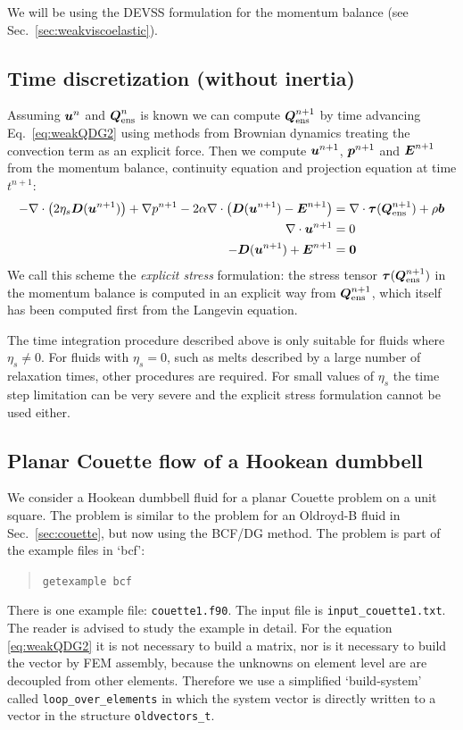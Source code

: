 We will be using the DEVSS formulation for the momentum balance
(see Sec.~\ref{sec:weakviscoelastic}).

\subsection{Time discretization (without inertia)}

Assuming $\boldsymbol{u}^{n}$ and $\boldsymbol{Q}^n_\text{ens}$ is known we can compute
$\boldsymbol{Q}^{n+1}_\text{ens}$ by
time advancing Eq.~\eqref{eq:weakQDG2} using methods from Brownian dynamics
treating the convection term as an explicit force.
Then we compute $\boldsymbol{u}^{n+1}$, 
$\boldsymbol{p}^{n+1}$ and $\boldsymbol{E}^{n+1}$ from the momentum balance,
continuity equation and projection equation at time $t^{n+1}$:
\begin{align}
      -\nabla\cdot\big(2\eta_s\boldsymbol{D}(\boldsymbol{u}^{n+1})\big) +\nabla p^{n+1} 
  -2\alpha\nabla\cdot\big( \boldsymbol{D}(\boldsymbol{u}^{n+1}) -\boldsymbol{E}^{n+1} \big)
&=\nabla\cdot\boldsymbol{\tau}(\boldsymbol{Q}^{n+1}_\text{ens})
        + \rho\boldsymbol{b} \label{eq:mombalQDG}\\
     \nabla\cdot\boldsymbol{u}^{n+1}&=0\\
   -\boldsymbol{D}(\boldsymbol{u}^{n+1})+\boldsymbol{E}^{n+1} &= \boldsymbol{0}
\end{align}
We call this scheme the \emph{explicit stress} formulation: the stress tensor
$\boldsymbol{\tau}(\boldsymbol{Q}^{n+1}_\text{ens})$ in the momentum balance is
computed in an
explicit way from $\boldsymbol{Q}^{n+1}_\text{ens}$, which itself has been
computed first from the Langevin equation.

The time integration procedure described above is only suitable for fluids
where $\eta_s\neq0$. For fluids with $\eta_s=0$, such as melts described by a
large number of relaxation times, other procedures are required.
For small values of
$\eta_s$ the time step limitation can be very severe and the explicit stress
formulation cannot be used either. 

\subsection{Planar Couette flow of a Hookean dumbbell}
\label{sec:bcfcouette}

We consider a Hookean dumbbell fluid for a planar Couette problem on a
unit square.
The problem is similar to the problem for an Oldroyd-B fluid in
Sec.~\ref{sec:couette}, but now using the BCF/DG method.
The problem is part of the example files in `bcf':
\begin{quote}
   \texttt{getexample bcf}
\end{quote}
There is one example file: \texttt{couette1.f90}.
The input file is \texttt{input\_couette1.txt}.
The reader is advised to study the example in detail.
For the equation \eqref{eq:weakQDG2} it is not necessary to build a matrix, nor
is it necessary to build the vector by FEM assembly, because the unknowns on
element level are are decoupled from other elements. Therefore we use a
simplified `build-system' called \texttt{loop\_over\_elements} in which the
system vector is directly written to a vector in the structure
\texttt{oldvectors\_t}.

